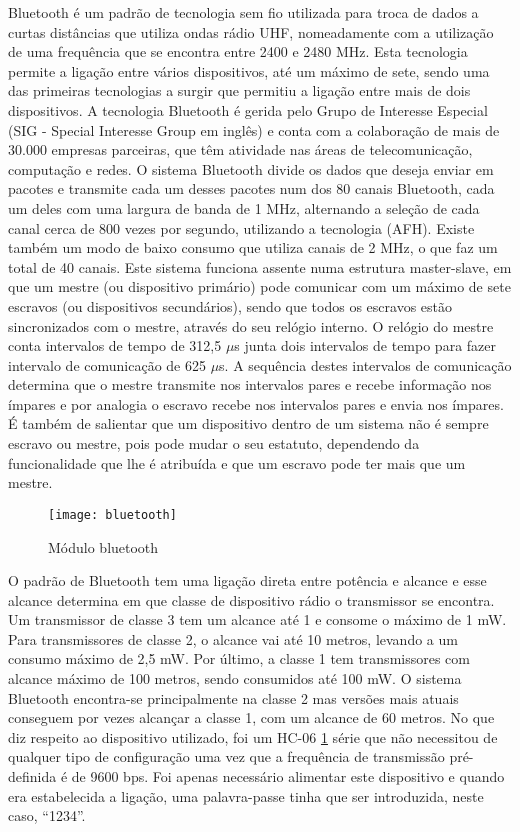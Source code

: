 Bluetooth é um padrão de tecnologia sem fio utilizada para troca de dados a curtas distâncias que utiliza ondas rádio UHF, nomeadamente com a utilização de uma frequência que se encontra entre 2400 e 2480 MHz.
Esta tecnologia permite a ligação entre vários dispositivos, até um máximo de sete, sendo uma das primeiras tecnologias a surgir que permitiu a ligação entre mais de dois dispositivos.
A tecnologia Bluetooth é gerida pelo Grupo de Interesse Especial (SIG - Special Interesse Group em inglês) e conta com a colaboração de mais de 30.000 empresas parceiras, que têm atividade nas áreas de telecomunicação, computação e redes.
O sistema Bluetooth divide os dados que deseja enviar em pacotes e transmite cada um desses pacotes num dos 80 canais Bluetooth, cada um deles com uma largura de banda de 1 MHz, alternando a seleção de cada canal cerca de 800 vezes por segundo, utilizando a tecnologia (AFH).
Existe também um modo de baixo consumo que utiliza canais de 2 MHz, o que faz um total de 40 canais.
Este sistema funciona assente numa estrutura master-slave, em que um mestre (ou dispositivo primário) pode comunicar com um máximo de sete escravos (ou dispositivos secundários), sendo que todos os escravos estão sincronizados com o mestre, através do seu relógio interno.
O relógio do mestre conta intervalos de tempo de 312,5 $\mu$s junta dois intervalos de tempo para fazer intervalo de comunicação de 625 $\mu$s.
A sequência destes intervalos de comunicação determina que o mestre transmite nos intervalos pares e recebe informação nos ímpares e por analogia o escravo recebe nos intervalos pares e envia nos ímpares.
É também de salientar que um dispositivo dentro de um sistema não é sempre escravo ou mestre, pois pode mudar o seu estatuto, dependendo da funcionalidade que lhe é atribuída e que um escravo pode ter mais que um mestre.

\begin{figure}[hbtp]
	\centering
	\texttt{[image: bluetooth]}
	\caption[Módulo bluetooth]{Módulo bluetooth \footnotemark}
	\label{fig:modulo_bluetooth}
\end{figure}

O padrão de Bluetooth tem uma ligação direta entre potência e alcance e esse alcance determina em que classe de dispositivo rádio o transmissor se encontra.
Um transmissor de classe 3 tem um alcance até 1 e consome o máximo de 1 mW.
Para transmissores de classe 2, o alcance vai até 10 metros, levando a um consumo máximo de 2,5 mW.
Por último, a classe 1 tem transmissores com alcance máximo de 100 metros, sendo consumidos até 100 mW.
O sistema Bluetooth encontra-se principalmente na classe 2 mas versões mais atuais conseguem por vezes alcançar a classe 1, com um alcance de 60 metros.
No que diz respeito ao dispositivo utilizado, foi um HC-06 \ref{fig:modulo_bluetooth} série que não necessitou de qualquer tipo de configuração uma vez que a frequência de transmissão pré-definida é de 9600 bps.
Foi apenas necessário alimentar este dispositivo e quando era estabelecida a ligação, uma palavra-passe tinha que ser introduzida, neste caso, ``1234''.

